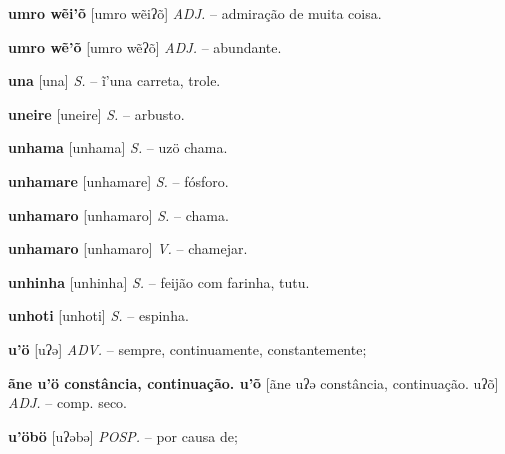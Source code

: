 \textbf{umro wẽi'õ} [umro wẽiʔõ] \textit{ADJ.} -- admiração de muita coisa.

\textbf{umro wẽ'õ} [umro wẽʔõ] \textit{ADJ.} -- abundante.

\textbf{una} [una] \textit{S.} -- ĩ'una carreta, trole.

\textbf{uneire} [uneire] \textit{S.} -- arbusto.

\textbf{unhama} [unhama] \textit{S.} -- uzö chama.

\textbf{unhamare} [unhamare] \textit{S.} -- fósforo.

\textbf{unhamaro} [unhamaro] \textit{S.} -- chama.

\textbf{unhamaro} [unhamaro] \textit{V.} -- chamejar.

\textbf{unhinha} [unhinha] \textit{S.} -- feijão com farinha, tutu.

\textbf{unhoti} [unhoti] \textit{S.} -- espinha.

\textbf{u'ö} [uʔə] \textit{ADV.} -- sempre, continuamente, constantemente;

\textbf{ãne u'ö constância, continuação. u'õ} [ãne uʔə constância, continuação. uʔõ] \textit{ADJ.} -- comp. seco.

\textbf{u'öbö} [uʔəbə] \textit{POSP.} -- por causa de;

